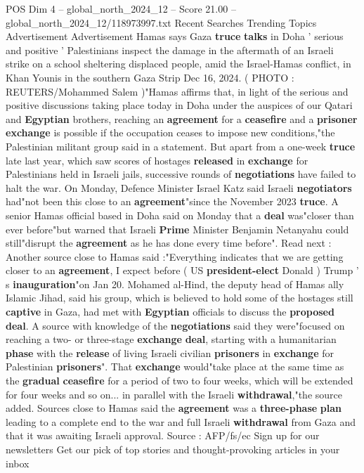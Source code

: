 \begin{textsample}{POS Dim 4 – global\_north\_2024\_12 – Score 21.00 – global\_north\_2024\_12/118973997.txt}  \label{ex:f4_pos_308}
Recent Searches Trending Topics Advertisement Advertisement Hamas says Gaza \textbf{truce} \textbf{talks} in Doha ' serious and positive ' Palestinians inspect the damage in the aftermath of an Israeli strike on a school sheltering displaced people, amid the Israel-Hamas conflict, in Khan Younis in the southern Gaza Strip Dec 16, 2024. ( PHOTO : REUTERS/Mohammed Salem )"Hamas affirms that, in light of the serious and positive discussions taking place today in Doha under the auspices of our Qatari and \textbf{Egyptian} brothers, reaching an \textbf{agreement} for a \textbf{ceasefire} and a \textbf{prisoner} \textbf{exchange} is possible if the occupation ceases to impose new conditions,"the Palestinian militant group said in a statement.
But apart from a one-week \textbf{truce} late last year, which saw scores of hostages \textbf{released} in \textbf{exchange} for Palestinians held in Israeli jails, successive rounds of \textbf{negotiations} have failed to halt the war.
On Monday, Defence Minister Israel Katz said Israeli \textbf{negotiators} had"not been this close to an \textbf{agreement}"since the November 2023 \textbf{truce}.
A senior Hamas official based in Doha said on Monday that a \textbf{deal} was"closer than ever before"but warned that Israeli \textbf{Prime} Minister Benjamin Netanyahu could still"disrupt the \textbf{agreement} as he has done every time before".
Read next : Another source close to Hamas said :"Everything indicates that we are getting closer to an \textbf{agreement}, I expect before ( US \textbf{president-elect} Donald ) Trump ' s \textbf{inauguration}"on Jan 20.
Mohamed al-Hind, the deputy head of Hamas ally Islamic Jihad, said his group, which is believed to hold some of the hostages still \textbf{captive} in Gaza, had met with \textbf{Egyptian} officials to discuss the \textbf{proposed} \textbf{deal}.
A source with knowledge of the \textbf{negotiations} said they were"focused on reaching a two- or three-stage \textbf{exchange} \textbf{deal}, starting with a humanitarian \textbf{phase} with the \textbf{release} of living Israeli civilian \textbf{prisoners} in \textbf{exchange} for Palestinian \textbf{prisoners}".
That \textbf{exchange} would"take place at the same time as the \textbf{gradual} \textbf{ceasefire} for a period of two to four weeks, which will be extended for four weeks and so on... in parallel with the Israeli \textbf{withdrawal},"the source added.
Sources close to Hamas said the \textbf{agreement} was a \textbf{three-phase} \textbf{plan} leading to a complete end to the war and full Israeli \textbf{withdrawal} from Gaza and that it was awaiting Israeli approval.
Source : AFP/fs/ec Sign up for our newsletters Get our pick of top stories and thought-provoking articles in your inbox

\end{textsample}
